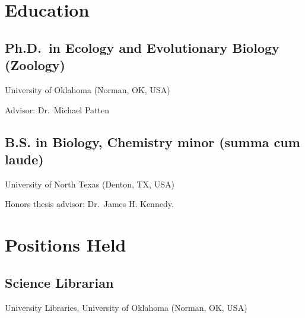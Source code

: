 \documentclass[
  letterpaper,
  DIV=11,
  numbers=noendperiod,
  oneside]{scrreprt}
\begin{document}
\chapter{Education}\label{education}

\section{Ph.D.~in Ecology and Evolutionary Biology
(Zoology)}\label{ph.d.-in-ecology-and-evolutionary-biology-zoology}

University of Oklahoma (Norman, OK, USA)


Advisor: Dr.~Michael Patten

\section{B.S. in Biology, Chemistry minor (summa cum
laude)}\label{b.s.-in-biology-chemistry-minor-summa-cum-laude}

University of North Texas (Denton, TX, USA)


Honors thesis advisor: Dr.~James H. Kennedy.


\chapter{Positions Held}\label{positions-held}

\section{Science Librarian}\label{sec-science-librarian}

University Libraries, University of Oklahoma (Norman, OK, USA)

\end{document}

